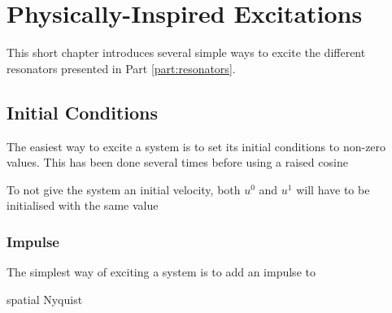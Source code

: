 \chapter{Physically-Inspired Excitations}\label{ch:physInspExcitations}
This short chapter introduces several simple ways to excite the different resonators presented in Part \ref{part:resonators}.

\section{Initial Conditions}
The easiest way to excite a system is to set its initial conditions to non-zero values. This has been done several times before using a raised cosine 

To not give the system an initial velocity, both $u^0$ and $u^1$ will have to be initialised with the same value

\subsection{Impulse}
The simplest way of exciting a system is to add an impulse to 

spatial Nyquist

